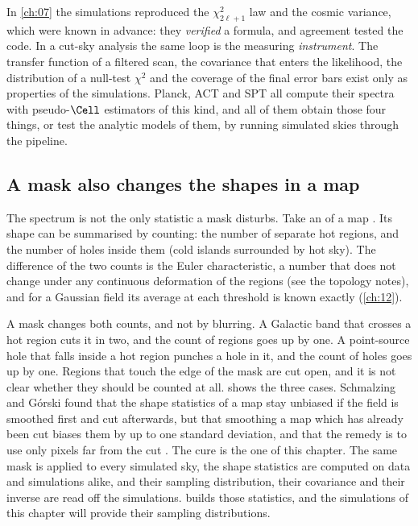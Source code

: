 \begin{inpractice}
In \cref{ch:07} the simulations reproduced the $\chi^2_{2\ell+1}$ law and the cosmic variance, which were
known in advance: they \emph{verified} a formula, and agreement tested the code. In a cut-sky analysis the
same loop is the measuring \emph{instrument}. The transfer function of a filtered scan, the covariance
that enters the likelihood, the distribution of a null-test $\chi^2$ and the coverage of the final error
bars exist only as properties of the simulations. Planck, ACT and SPT all compute their spectra
with pseudo-$\Cell$ estimators of this kind, and all of them obtain those four things, or test the
analytic models of them, by running simulated skies through the pipeline.
\end{inpractice}

\subsection{A mask also changes the shapes in a map}
\label{8b:sec:topology-seed}

The spectrum is not the only statistic a mask disturbs. Take an  of a map
. Its shape can be summarised by
counting: the number of separate hot regions, and the number of holes inside them (cold islands surrounded by hot
sky). The difference of the two counts is the Euler characteristic, a number that does not change
under any continuous deformation of the regions (see the topology notes), and for a Gaussian field its
average at each threshold is known exactly (\cref{ch:12}).

A mask changes both counts, and not by blurring. A Galactic band that crosses a hot region cuts it in
two, and the count of regions goes up by one. A point-source hole that falls inside a hot region
punches a hole in it, and the count of holes goes up by one. Regions that touch the edge of the mask are
cut open, and it is not clear whether they should be counted at all.  shows the
three cases. Schmalzing and G\'orski found that the shape statistics of a map stay unbiased if the field is
smoothed first and cut afterwards, but that smoothing a map which has already been cut biases them by up
to one standard deviation, and that the remedy is to use only pixels far from the cut
\cite{SchmalzingGorski1998}. The cure is the one of this chapter. The same mask is applied to every
simulated sky, the shape statistics are computed on data and simulations alike, and their sampling
distribution, their covariance and their inverse are read off the simulations.  builds those
statistics, and the simulations of this chapter will provide their sampling distributions.


